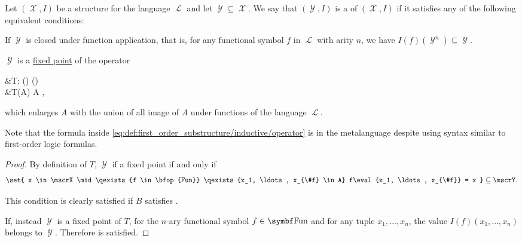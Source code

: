 \begin{definition}\label{def:first_order_substructure}
  Let \( (\mscrX, I) \) be a structure for the language \( \mscrL \) and let \( \mscrY \subseteq \mscrX \). We say that \( (\mscrY, I) \) is a  of \( (\mscrX, I) \) if it satisfies any of the following equivalent conditions:

  \begin{defenum}
     If \( \mscrY \) is closed under function application, that is, for any functional symbol \( f \) in \( \mscrL \) with arity \( n \), we have \( I(f)(\mscrY^n) \subseteq \mscrY \).

     \( \mscrY \) is a \hyperref[def:fixed_point]{fixed point} of the operator
    \begin{alignedeq}\label{eq:def:first_order_substructure/inductive/operator}
      &T: \pow(\mscrX) \to \pow(\mscrX) \\
      &T(A) \coloneqq A \cup {},
    \end{alignedeq}
    which enlarges \( A \) with the union of all image of \( A \) under functions of the language \( \mscrL \).

    Note that the formula inside \eqref{eq:def:first_order_substructure/inductive/operator} is in the metalanguage despite using syntax similar to first-order logic formulas.
  \end{defenum}
\end{definition}
\begin{proof}
  By definition of \( T \), \( \mscrY \) if a fixed point if and only if
  \begin{equation*}
    \set{ x \in \mscrX \mid \qexists{f \in \bfop{Fun}} \qexists{x_1, \ldots, x_{\#f} \in A} f\eval{x_1, \ldots, x_{\#f}} = x } \subseteq \mscrY.
  \end{equation*}

  This condition is clearly satisfied if \( B \) satisfies .

  If, instead \( \mscrY \) is a fixed point of \( T \), for the \( n \)-ary functional symbol \( f \in \bfop{Fun} \) and for any tuple \( x_1, \ldots, x_n \), the value \( I(f)(x_1, \ldots, x_n) \) belongs to \( \mscrY \). Therefore  is satisfied.
\end{proof}


